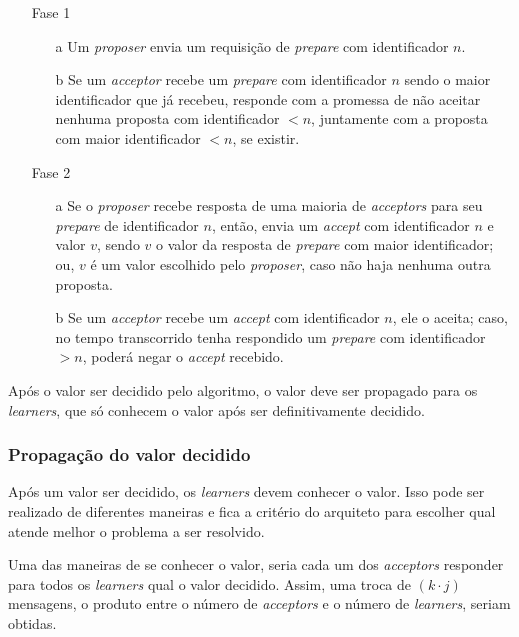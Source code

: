 \documentclass[
    12pt,
    openright, 
    oneside,
    a4paper,
    french,
    english,
    brazil
    ]{facom-ufu-abntex2}
\theoremstyle{definition}
\begin{document}
\begin{itemize}
    \item [Fase 1]
    \begin{itemize}
        \item [a] Um \emph{proposer} envia um requisição de \emph{prepare} com
        identificador $n$.
        
        \item [b] Se um \emph{acceptor} recebe um \emph{prepare} com identificador
        $n$ sendo o maior identificador que já recebeu, responde com a promessa de não
        aceitar nenhuma proposta com identificador $<n$, juntamente com a proposta com
        maior identificador $<n$, se existir.
    \end{itemize}
    
    \item [Fase 2]
    \begin{itemize}
        \item [a] Se o \emph{proposer} recebe resposta de uma maioria de \emph{acceptors}
        para seu \emph{prepare} de identificador $n$, então, envia um \emph{accept} 
        com identificador $n$ e valor $v$, sendo $v$ o valor da resposta de \emph{prepare}
        com maior identificador; ou, $v$ é um valor escolhido pelo \emph{proposer}, caso
        não haja nenhuma outra proposta.
        
        \item [b] Se um \emph{acceptor} recebe um \emph{accept} com identificador $n$,
        ele o aceita; caso, no tempo transcorrido tenha respondido um \emph{prepare}
        com identificador $>n$, poderá negar o \emph{accept} recebido.
    \end{itemize}
\end{itemize}

Após o valor ser decidido pelo algoritmo, o valor deve ser propagado para os \emph{learners},
que só conhecem o valor após ser definitivamente decidido.

\subsubsection{Propagação do valor decidido}
Após um valor ser decidido, os \emph{learners} devem conhecer o valor. Isso pode ser realizado
de diferentes maneiras e fica a critério do arquiteto para escolher qual atende melhor o
problema a ser resolvido.

Uma das maneiras de se conhecer o valor, seria cada um dos \emph{acceptors} responder para
todos os \emph{learners} qual o valor decidido. Assim, uma troca de $(k \cdot j)$ mensagens, 
o produto entre o número de \emph{acceptors} e o número de \emph{learners}, seriam obtidas.
\end{document}
